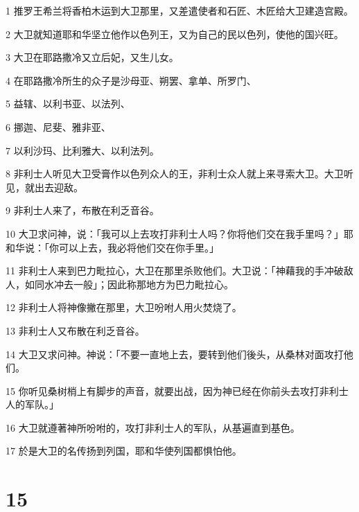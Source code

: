 \par 1 推罗王希兰将香柏木运到大卫那里，又差遣使者和石匠、木匠给大卫建造宫殿。
\par 2 大卫就知道耶和华坚立他作以色列王，又为自己的民以色列，使他的国兴旺。
\par 3 大卫在耶路撒冷又立后妃，又生儿女。
\par 4 在耶路撒冷所生的众子是沙母亚、朔罢、拿单、所罗门、
\par 5 益辖、以利书亚、以法列、
\par 6 挪迦、尼斐、雅非亚、
\par 7 以利沙玛、比利雅大、以利法列。
\par 8 非利士人听见大卫受膏作以色列众人的王，非利士众人就上来寻索大卫。大卫听见，就出去迎敌。
\par 9 非利士人来了，布散在利乏音谷。
\par 10 大卫求问神，说：「我可以上去攻打非利士人吗？你将他们交在我手里吗？」耶和华说：「你可以上去，我必将他们交在你手里。」
\par 11 非利士人来到巴力毗拉心，大卫在那里杀败他们。大卫说：「神藉我的手冲破敌人，如同水冲去一般」；因此称那地方为巴力毗拉心。
\par 12 非利士人将神像撇在那里，大卫吩咐人用火焚烧了。
\par 13 非利士人又布散在利乏音谷。
\par 14 大卫又求问神。神说：「不要一直地上去，要转到他们後头，从桑林对面攻打他们。
\par 15 你听见桑树梢上有脚步的声音，就要出战，因为神已经在你前头去攻打非利士人的军队。」
\par 16 大卫就遵著神所吩咐的，攻打非利士人的军队，从基遍直到基色。
\par 17 於是大卫的名传扬到列国，耶和华使列国都惧怕他。

\chapter{15}

